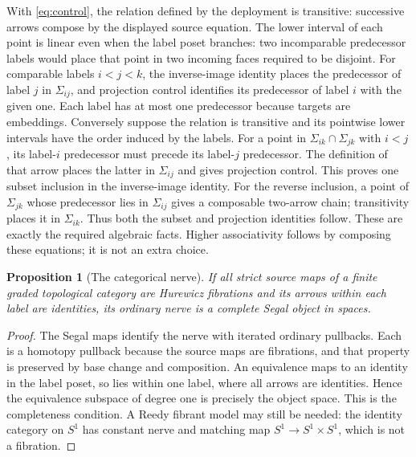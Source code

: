 \documentclass[11pt,a4paper]{article}
\newtheorem{proposition}[theorem]{Proposition}
\theoremstyle{definition}
\begin{document}
\label{proof:projection-control}
With \eqref{eq:control}, the relation defined by the deployment is
transitive: successive arrows compose by the displayed source equation.
The lower interval of each point is linear even when the label poset
branches: two incomparable predecessor labels would place that point
in two incoming faces required to be disjoint. For comparable labels
$i<j<k$, the inverse-image identity places the predecessor of label
$j$ in $\Sigma_{ij}$, and projection control identifies its predecessor
of label $i$ with the given one. Each label has at most one predecessor
because targets are embeddings. Conversely suppose the relation is transitive and its pointwise lower
intervals have the order induced by the labels. For a point in
$\Sigma_{ik}\cap\Sigma_{jk}$ with $i<j$, its label-$i$ predecessor
must precede its label-$j$ predecessor. The definition of that arrow
places the latter in $\Sigma_{ij}$ and gives projection control.
This proves one subset inclusion in the inverse-image identity. For
the reverse inclusion, a point of $\Sigma_{jk}$ whose predecessor
lies in $\Sigma_{ij}$ gives a composable two-arrow chain; transitivity
places it in $\Sigma_{ik}$. Thus both the subset and projection
identities follow. These are exactly the required algebraic facts. Higher
associativity follows by composing these equations; it is not an extra choice.

\begin{proposition}[The categorical nerve]\label{prop:seg}
If all strict source maps of a finite graded topological category are
Hurewicz fibrations and its arrows within each label are identities,
its ordinary nerve is a complete Segal object in spaces.
\end{proposition}
\begin{proof}
The Segal maps identify the nerve with iterated ordinary pullbacks.
Each is a homotopy pullback because the source maps are fibrations,
and that property is preserved by base change and composition.
An equivalence maps to an identity in the label poset, so lies within
one label, where all arrows are identities. Hence the equivalence
subspace of degree one is precisely the object space. This is the
completeness condition. A Reedy fibrant model may still be needed:
the identity category on $S^1$ has constant nerve and matching map
$S^1\to S^1\times S^1$, which is not a fibration.
\end{proof}
\end{document}
